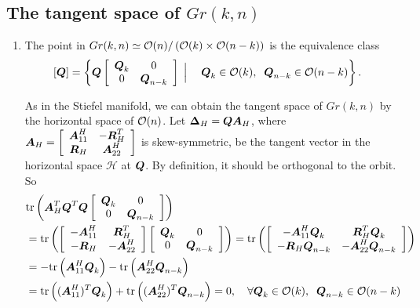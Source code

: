 \documentclass[11pt]{article}
\begin{document}
\subsection{The tangent space of $Gr(k, n)$}
\begin{enumerate}
\item The point in $Gr(k,n) \simeq  {\mathcal O}(n)/\left({\mathcal O}(k)\times {\mathcal O}(n-k)\right)$ is the equivalence class 
\begin{align*}
\left[\boldsymbol{Q}\right] &= \left\{\boldsymbol{Q}\left[\begin{array}{cc}
\boldsymbol{Q}_{k} & 0 \\ 
0 & \boldsymbol{Q}_{n-k}
\end{array} \right]\;\Big| \; \quad  \boldsymbol{Q}_{k}\in {\mathcal O}(k), \;\; \boldsymbol{Q}_{n-k} \in {\mathcal O}(n-k) \right\}.
\end{align*}

As in the Stiefel manifold, we can obtain the tangent space of $Gr(k,n)$ by the horizontal space of ${\mathcal O}(n)$. Let $\boldsymbol{\Delta}_{H} = \boldsymbol{Q}\boldsymbol{A}_{H}$, where $\boldsymbol{A}_{H}= \left[\begin{array}{cc}
\boldsymbol{A}_{11}^{H} & -\boldsymbol{R}_{H}^{T} \\ 
\boldsymbol{R}_{H} & \boldsymbol{A}_{22}^{H}
\end{array} \right]$ is skew-symmetric, be the tangent vector in the horizontal space $\mathcal{H}$ at $\boldsymbol{Q}$. By definition, it should be orthogonal to the orbit.  So 
\begin{align*}
&\tr{\mb{A}_{H}^{T}\mb{Q}^{T}\mb{Q}\brac{\begin{array}{cc}
\mb{Q}_{k} & 0 \\ 
0 & \mb{Q}_{n-k}
\end{array} }}\\
&=\tr{\brac{\begin{array}{cc}
-\mb{A}_{11}^{H} & \mb{R}_{H}^{T} \\ 
-\mb{R}_{H} & -\mb{A}_{22}^{H}
\end{array} }\brac{\begin{array}{cc}
\mb{Q}_{k} & 0 \\ 
0 & \mb{Q}_{n-k}
\end{array} }} = \tr{ \brac{\begin{array}{cc}
-\mb{A}_{11}^{H}\mb{Q}_{k} & \mb{R}_{H}^{T}\mb{Q}_{k} \\ 
-\mb{R}_{H}\mb{Q}_{n-k} & -\mb{A}_{22}^{H}\mb{Q}_{n-k}
\end{array} } }\\
&= -\tr{\mb{A}_{11}^{H}\mb{Q}_{k}}-\tr{\mb{A}_{22}^{H} \mb{Q}_{n-k}}\\
&= \tr{(\mb{A}_{11}^{H})^{T}\mb{Q}_{k}}+\tr{(\mb{A}_{22}^{H})^{T}\mb{Q}_{n-k}}=0, \quad \forall \mb{Q}_{k}\in \cO(k), \;\; \mb{Q}_{n-k} \in \cO(n-k)

\end{align*}
\end{enumerate}
\end{document}
